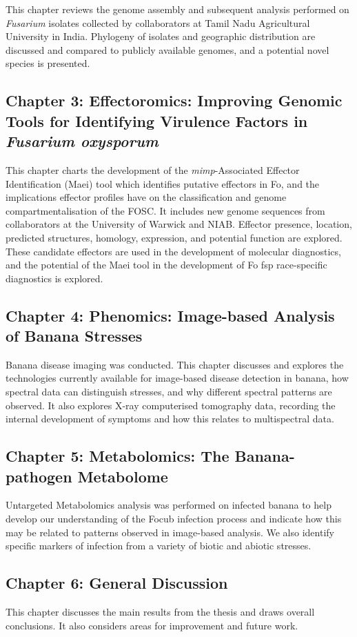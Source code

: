 This chapter reviews the  genome assembly and subsequent analysis performed on \textit{Fusarium} isolates collected by collaborators at Tamil Nadu Agricultural University in India. Phylogeny of isolates and geographic distribution are discussed and compared to publicly available genomes, and a potential novel species is presented. 

\subsection{Chapter 3: Effectoromics: Improving Genomic Tools for Identifying Virulence Factors in \textit{Fusarium oxysporum}} 

This chapter charts the development of the \textit{mimp}-Associated Effector Identification (Maei) tool which identifies putative effectors in \acl{Fo}, and the implications effector profiles have on the classification and genome compartmentalisation of the FOSC. It includes new genome sequences from collaborators at the University of Warwick and NIAB. Effector presence, location, predicted structures, homology, expression, and potential function are explored. 
These candidate effectors are used in the development of molecular diagnostics, and the potential of the Maei tool in the development of \acl{Fo} \ac{fsp} race-specific diagnostics is explored. 

\subsection{Chapter 4: Phenomics: Image-based Analysis of Banana Stresses}

Banana disease imaging was conducted. This chapter discusses and explores the technologies currently available for image-based disease detection in banana, how spectral data can distinguish stresses, and why different spectral patterns are observed. 
It also explores X-ray computerised tomography data, recording the internal development of symptoms and how this relates to multispectral data.

\subsection{Chapter 5: Metabolomics: The Banana-pathogen Metabolome}
Untargeted Metabolomics analysis was performed on infected banana to help develop our understanding of the \acl{Focub} infection process and indicate how this may be related to patterns observed in image-based analysis. We also identify specific markers of infection from a variety of biotic and abiotic stresses. 

\subsection{Chapter 6: General Discussion}
This chapter discusses the main results from the thesis and draws overall conclusions. It also considers areas for improvement and future work. 


 

 



 



 



 